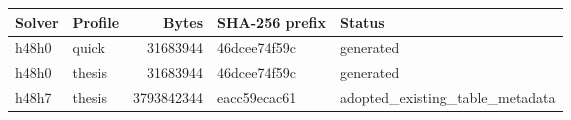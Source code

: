 {\small
\begin{tabular}{llrll}
\hline
Solver & Profile & Bytes & SHA-256 prefix & Status \\
\hline
h48h0 & quick & 31683944 & 46dcee74f59c & generated \\
h48h0 & thesis & 31683944 & 46dcee74f59c & generated \\
h48h7 & thesis & 3793842344 & eacc59ecac61 & adopted\_existing\_table\_metadata \\
\hline
\end{tabular}
}
